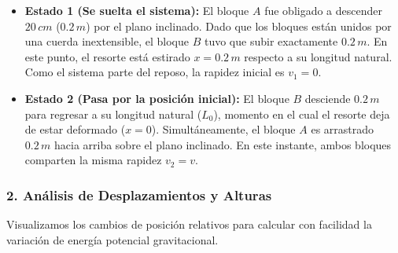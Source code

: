 \documentclass[12pt, a4paper]{article}
\begin{document}
\begin{itemize}
    \item \textbf{Estado 1 (Se suelta el sistema):} El bloque $A$ fue obligado a descender $20 \, \si{cm}$ ($0.2 \, \si{m}$) por el plano inclinado. Dado que los bloques están unidos por una cuerda inextensible, el bloque $B$ tuvo que subir exactamente $0.2 \, \si{m}$. En este punto, el resorte está estirado $x = 0.2 \, \si{m}$ respecto a su longitud natural. Como el sistema parte del reposo, la rapidez inicial es $v_1 = 0$.
    \item \textbf{Estado 2 (Pasa por la posición inicial):} El bloque $B$ desciende $0.2 \, \si{m}$ para regresar a su longitud natural ($L_0$), momento en el cual el resorte deja de estar deformado ($x = 0$). Simultáneamente, el bloque $A$ es arrastrado $0.2 \, \si{m}$ hacia arriba sobre el plano inclinado. En este instante, ambos bloques comparten la misma rapidez $v_2 = v$.
\end{itemize}

\subsubsection*{2. Análisis de Desplazamientos y Alturas}
Visualizamos los cambios de posición relativos para calcular con facilidad la variación de energía potencial gravitacional.
\end{document}
